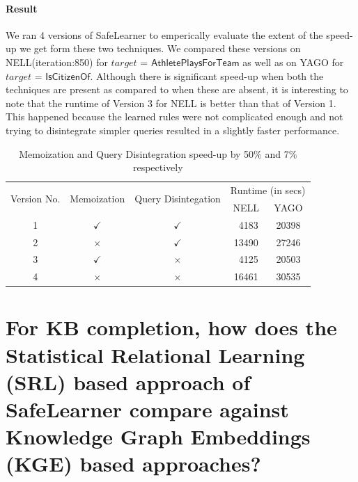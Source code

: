 \documentclass[akbc,twoside,11pt]{article}
\newcommand{\algorithmname}{SafeLearner\xspace}
\begin{document}
\paragraph{Result}
We ran 4 versions of \algorithmname to emperically evaluate the extent of the speed-up we get form these two techniques. We compared these versions on NELL(iteration:850) for $target$ = $\mathsf{AthletePlaysForTeam}$ as well as on YAGO for $target$ = $\mathsf{IsCitizenOf}$. Although there is significant speed-up when both the techniques are present as compared to when these are absent, it is interesting to note that the runtime of Version 3 for NELL is better than that of Version 1. This happened because the learned rules were not complicated enough and not trying to disintegrate simpler queries resulted in a slightly faster performance.

\begin{table}[H]
\centering
\begin{tabular}{|c|c|c|c|c|}
\hline
\multirow{2}{*}{Version No.}	& \multirow{2}{*}{Memoization}	 & \multirow{2}{*}{Query Disintegation} &	 \multicolumn{2}{c|}{Runtime (in secs)}\\
\cline{4-5}
& & & NELL & YAGO \\
\hline
1 & $\checkmark$ & $\checkmark$ & \ 4183 & 20398\\
2 & $\times$ & $\checkmark$ & 13490 & 27246\\
3 & $\checkmark$ & $\times$ & \ 4125 & 20503\\
4 & $\times$ & $\times$ & 16461 & 30535\\
\hline
\end{tabular}
\caption{Memoization and Query Disintegration speed-up by 50\% and 7\% respectively}\label{table:speedup}
\end{table}

\section{For KB completion, how does the Statistical Relational Learning (SRL) based approach of \algorithmname compare against Knowledge Graph Embeddings (KGE) based approaches?}\label{appendix:5}
\end{document}
